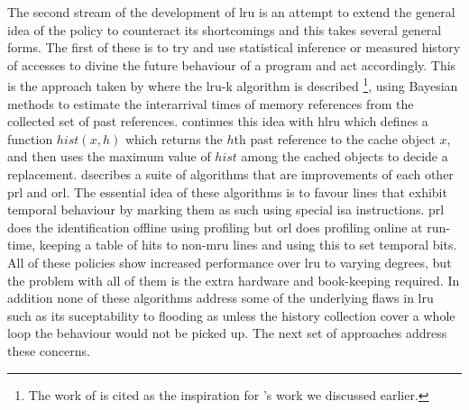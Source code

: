 The second stream of the development of \gls{lru} is an attempt to extend the general idea of the policy to counteract its shortcomings and this takes several general forms. The first of these is to try and use statistical inference or measured history of accesses to divine the future behaviour of a program and act accordingly. This is the approach taken by \citet{oneilLRUKPageReplacement1993} where the \gls{lru-k} algorithm is described \footnote{The work of \citet{oneilLRUKPageReplacement1993} is cited as the inspiration for \citet{sokolinskyLFUKEffectiveBuffer2004}'s work we discussed earlier.}, using Bayesian methods to estimate the interarrival times of memory references from the collected set of past references. \citet{vakaliLRUbasedAlgorithmsWeb2000} continues this idea with \gls{hlru} which defines a function $hist(x,h)$ which returns the $h$th past reference to the cache object $x$, and then uses the maximum value of $hist$ among the cached objects to decide a replacement. \citet{wongModifiedLRUPolicies2000} dsecribes a suite of algorithms that are improvements of each other \gls{prl} and \gls{orl}. The essential idea of these algorithms is to favour lines that exhibit temporal behaviour by marking them as such using special \gls{isa} instructions. \gls{prl} does the identification offline using profiling but \gls{orl} does profiling online at run-time, keeping a table of hits to non-\gls{mru} lines and using this to set temporal bits. All of these policies show increased performance over \gls{lru} to varying degrees, but the problem with all of them is the extra hardware and book-keeping required. In addition none of these algorithms address some of the underlying flaws in \gls{lru} such as its suceptability to flooding \cite{glassAdaptivePageReplacement1997} as unless the history collection cover a whole loop the behaviour would not be picked up. The next set of approaches address these concerns.

